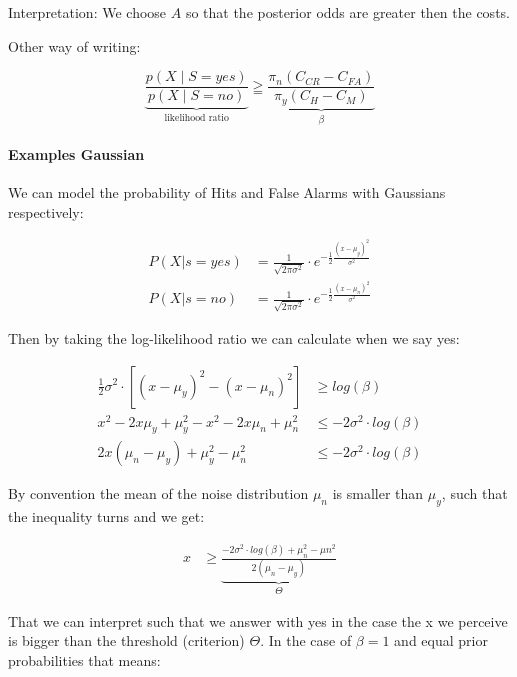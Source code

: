 \documentclass[../main/Notes.tex]{subfiles}
\begin{document}
Interpretation: We choose $A$ so that the posterior odds are greater then the costs.

Other way of writing:

\begin{equation}
\underbrace{\frac{p(X \mid S=yes)}{p(X \mid S=no)}}_\text{likelihood ratio} \geqq \underbrace{\frac{\pi_n(C_{CR} - C_{FA})}{\pi_y(C_H - C_M)}}_\beta
\end{equation}


\paragraph{Examples Gaussian}

We can model the probability of Hits and False Alarms with Gaussians respectively:

\begin{align*}
  P\left(X|s=yes\right) &= \frac{1}{\sqrt{2\pi \sigma^2}} \cdot e^{-\frac{1}{2}\frac{\left(x-\mu_y\right)^2}{\sigma^2}}\\
  P\left(X|s=no\right) &= \frac{1}{\sqrt{2\pi \sigma^2}} \cdot e^{-\frac{1}{2}\frac{\left(x-\mu_n\right)^2}{\sigma^2}}
\end{align*}

Then by taking the log-likelihood ratio we can calculate when we say yes:

\begin{align*}
 \frac{1}{2}\sigma^2 \cdot \left[\left(x-\mu_y\right)^2 - \left(x-\mu_n\right)^2 \right] &\geq log\left(\beta\right)\\
  x^2 - 2x\mu_y + \mu_{y}^{2} - x^2 - 2x\mu_n + \mu_{n}^{2} &\leq - 2\sigma^2 \cdot log\left(\beta\right)\\
  2x\left(\mu_n - \mu_y\right)+\mu_{y}^{2}-\mu_{n}^{2}&\leq -2\sigma^2\cdot log\left(\beta\right)\end{align*}
  
By convention the mean of the noise distribution $\mu_n$ is smaller than $\mu_y$, such that the inequality turns and we get:

\begin{align*}
  x  &\geq \underbrace{\frac{-2\sigma^2 \cdot log\left(\beta\right) + \mu_{n}^{2}-\mu{n}^{2}}{2\left(\mu_n-\mu_y\right)}}_{\Theta}
\end{align*}

That we can interpret such that we answer with yes in the case the x we perceive is bigger than the threshold (criterion) $\Theta$.
In the case of $\beta = 1$ and equal prior probabilities that means:
\end{document}
